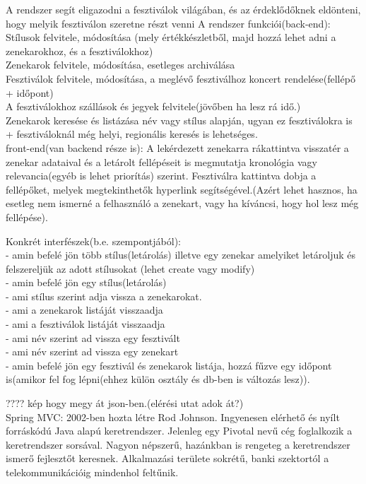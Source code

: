 \documentclass[11pt]{article}
\begin{document}
A rendszer segít eligazodni a fesztiválok világában, és az érdeklődőknek eldönteni, hogy melyik fesztiválon szeretne részt venni
A rendszer funkciói(back-end):\\
Stílusok felvitele, módosítása (mely értékkészletből, majd hozzá lehet adni a zenekarokhoz, és a fesztiválokhoz)\\
Zenekarok felvitele, módosítása, esetleges archiválása\\
Fesztiválok felvitele, módosítása, a meglévő fesztiválhoz koncert rendelése(fellépő + időpont)\\
A fesztiválokhoz szállások és jegyek felvitele(jövőben ha lesz rá idő.)\\
Zenekarok keresése és listázása név vagy stílus alapján, ugyan ez fesztiválokra is + fesztiváloknál még helyi, regionális keresés is lehetséges.\\

front-end(van backend része is):
A lekérdezett zenekarra rákattintva visszatér a zenekar adataival és a letárolt fellépéseit is megmutatja kronológia vagy relevancia(egyéb is lehet priorítás) szerint.
Fesztiválra kattintva dobja a fellépőket, melyek megtekinthetők hyperlink segítségével.(Azért lehet hasznos, ha esetleg nem ismerné a felhasználó a zenekart, vagy ha kíváncsi, hogy hol lesz még fellépése).

Konkrét interfészek(b.e. szempontjából):
\\- amin befelé jön több stílus(letárolás) illetve egy zenekar amelyiket letároljuk és felszereljük az adott stílusokat (lehet create vagy modify)
\\- amin befelé jön egy stílus(letárolás)
\\- ami stílus szerint adja vissza a zenekarokat.
\\- ami a zenekarok listáját visszaadja
\\- ami a fesztiválok listáját visszaadja
\\- ami név szerint ad vissza egy fesztivált
\\- ami név szerint ad vissza egy zenekart
\\- amin befelé jön egy fesztivál és zenekarok listája, hozzá fűzve egy időpont is(amikor fel fog lépni(ehhez külön osztály és db-ben is változás lesz)).
 
????
kép hogy megy át json-ben.(elérési utat adok át?)\\



Spring MVC: 2002-ben hozta létre Rod Johnson. Ingyenesen elérhető és nyílt forráskódú Java alapú keretrendszer. Jelenleg egy Pivotal nevű cég foglalkozik a keretrendszer sorsával. Nagyon népszerű, hazánkban is rengeteg a keretrendszer ismerő fejlesztőt keresnek. Alkalmazási területe sokrétű, banki szektortól a telekommunikációig mindenhol feltűnik.\\
\end{document}
